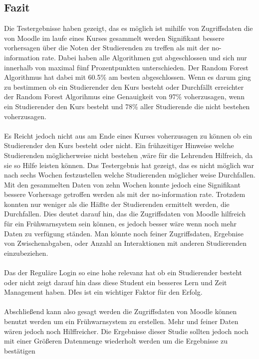 \subsection{Fazit}
Die Testergebnisse haben gezeigt, das es möglich ist mihilfe von Zugriffsdaten die von Moodle im laufe eines Kurses gesammelt werden Signifikant bessere vorhersagen über die Noten der Studierenden zu treffen als mit der \glqq no-information rate\grqq{}.
Dabei haben alle Algorithmen gut abgeschlossen und sich nur innerhalb von maximal fünf Prozentpunkten unterschieden. Der Random Forest Algorithmus hat dabei mit 60.5\% am besten abgeschlossen. 
Wenn es darum ging zu bestimmen ob ein Studierender den Kurs besteht oder Durchfällt erreichter der Random Forest Algorihmus eine Genauigkeit von 97\% voherzusagen, wenn ein Studierender den Kurs besteht und 78\% aller Studierende die nicht bestehen voherzusagen.
\\ \noindent \\ \noindent
Es Reicht jedoch nicht aus am Ende eines Kurses voherzusagen zu können ob ein Studierender den Kurs besteht oder nicht.
Ein frühzeitiger Hinweise welche Studierenden möglicherweise nicht bestehen ,wäre für die Lehrenden Hilfreich, da sie so Hilfe leisten können.
Das Testergebnis hat gezeigt, das es nicht möglich war nach sechs Wochen festzustellen welche Studierenden möglicher weise Durchfallen. 
Mit den gesammelten Daten von zehn Wochen konnte jedoch eine Signifikant bessere Vorhersage getroffen werden als mit der \glqq no-information rate\grqq{}.
Trotzdem konnten nur weniger als die Häflte der Studierenden ermittelt werden, die Durchfallen. Dies deutet darauf hin, das die Zugriffsdaten von Moodle hilfreich für ein Frühwarnsystem sein können,
es jedoch besser wäre wenn noch mehr Daten zu verfügung ständen. Man könnte noch feiner Zugriffsdaten, Ergebnise von Zwischenabgaben, oder Anzahl an Interaktionen mit anderen Studierenden einzubeziehen.
\\ \noindent \\ \noindent
Das der Reguläre Login so eine hohe relevanz hat ob ein Studierender besteht oder nicht zeigt darauf hin dass diese Student ein besseres Lern und Zeit Management haben. DIes ist ein wichtiger Faktor für den Erfolg.
\\ \noindent \\ \noindent
Abschließend kann also gesagt werden die Zugriffsdaten von Moodle können benutzt werden um ein Frühwarnsystem zu erstellen. Mehr und feiner Daten wären jedoch noch Hilffreicher.
Die Ergebnisse dieser Studie sollten jedoch noch mit einer Größeren Datenmenge wiederholt werden um die Ergebnisse zu bestätigen

